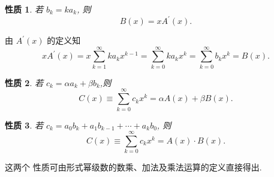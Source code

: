 \documentclass[punct]{ctexbeamer}
\newtheorem{pr}{性质}
\def\pf{\noindent {\bf 证明\ }}
\begin{document}
%
\begin{frame}
	\begin{pr}
		若 $b_{k}=k a_{k}$, 则
		$$
		B(x)=x A^{\prime}(x).
		$$
	\end{pr}
\pause
\pf 由 $A^{\prime}(x)$ 的定义知
$$
x A^{\prime}(x)=x \sum_{k=1}^{\infty} k a_{k} x^{k-1}=\sum_{k=0}^{\infty} k a_{k} x^{k}=\sum_{k=0}^{\infty} b_{k} x^{k}=B(x).
$$
\end{frame}

\begin{frame}
	\begin{pr}
		若 $c_{k}=\alpha a_{k}+\beta b_{k}$,则
		$$
		C(x) \equiv \sum_{k=0}^{\infty} c_{k} x^{k}=\alpha A(x)+\beta B(x).
		$$
	\end{pr}
\begin{pr}
	若 $c_{k}=a_{0} b_{k}+a_{1} b_{k-1}+\cdots+a_{k} b_{0}$, 则
	$$
	C(x) \equiv \sum_{k=0}^{\infty} c_{k} x^{k}=A(x) \cdot B(x).
	$$
\end{pr}
这两个 性质可由形式幂级数的数乘、加法及乘法运算的定义直接得出.
\end{frame}
\end{document}

